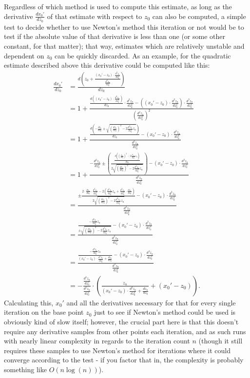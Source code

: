 \documentclass[12pt,a4paper]{article}
\begin{document}
Regardless of which method is used to compute this estimate, as long as the derivative $\frac{dx_0'}{dz_0}$ of that estimate with respect to $z_0$ can also be computed, a simple test to decide whether to use Newton's method this iteration or not would be to test if the absolute value of that derivative is less than one (or some other constant, for that matter); that way, estimates which are relatively unstable and dependent on $z_0$ can be quickly discarded. As an example, for the quadratic estimate described above this derivative could be computed like this:
\begin{align*}
	\frac{dx_0'}{dz_0} &= \frac{d\left(z_0+\frac{(x_0'-z_0)\cdot\frac{d^2z_n}{dz_0^2}}{\frac{d^2z_n}{dz_0^2}}\right)}{dz_0}\\
	&= 1+\frac{\frac{d\left((x_0'-z_0)\cdot\frac{d^2z_n}{dz_0^2}\right)}{dz_0}\cdot\frac{d^2z_n}{dz_0^2}-((x_0'-z_0)\cdot\frac{d^2z_n}{dz_0^2})\cdot\frac{d^3z_n}{dz_0^3}}{(\frac{d^2z_n}{dz_0^2})^2}\\
	&= 1+\frac{\frac{d\left(-\frac{dz_n}{dz_0}\pm\sqrt{(\frac{dz_n}{dz_0})^2-2\frac{d^2z_n}{dz_0^2}z_n}\right)}{dz_0}-(x_0'-z_0)\cdot\frac{d^3z_n}{dz_0^3}}{\frac{d^2z_n}{dz_0^2}}\\
	&= 1+\frac{-\frac{d^2z_n}{dz_0^2}\pm\left(\frac{\frac{d((\frac{dz_n}{dz_0})^2-2\frac{d^2z_n}{dz_0^2}z_n)}{dz_0}}{2\sqrt{(\frac{dz_n}{dz_0})^2-2\frac{d^2z_n}{dz_0^2}z_n}}\right)-(x_0'-z_0)\cdot\frac{d^3z_n}{dz_0^3}}{\frac{d^2z_n}{dz_0^2}}\\
	&= \frac{\pm\frac{2\cdot\frac{dz_n}{dz_0}\cdot\frac{d^2z_n}{dz_0^2}-2(\frac{d^3z_n}{dz_0^3}z_n+\frac{d^2z_n}{dz_0^2}\cdot\frac{dz_n}{dz_0})}{2\sqrt{(\frac{dz_n}{dz_0})^2-2\frac{d^2z_n}{dz_0^2}z_n}}-(x_0'-z_0)\cdot\frac{d^3z_n}{dz_0^3}}{\frac{d^2z_n}{dz_0^2}}\\
	&= \frac{\frac{-\frac{d^3z_n}{dz_0^3}z_n}{\pm\sqrt{(\frac{dz_n}{dz_0})^2-2\frac{d^2z_n}{dz_0^2}z_n}}-(x_0'-z_0)\cdot\frac{d^3z_n}{dz_0^3}}{\frac{d^2z_n}{dz_0^2}}\\
	&= \frac{\frac{-\frac{d^3z_n}{dz_0^3}z_n}{(x_0'-z_0)\cdot\frac{d^2z_n}{dz_0^2}+\frac{dz_n}{dz_0}}-(x_0'-z_0)\cdot\frac{d^3z_n}{dz_0^3}}{\frac{d^2z_n}{dz_0^2}}\\
	&= -\frac{\frac{d^3z_n}{dz_0^3}}{\frac{d^2z_n}{dz_0^2}}\cdot\left(\frac{z_n}{(x_0'-z_0)\cdot\frac{d^2z_n}{dz_0^2}+\frac{dz_n}{dz_0}}+(x_0'-z_0)\right).
\end{align*}
Calculating this, $x_0'$ and all the derivatives necessary for that for every single iteration on the base point $z_0$ just to see if Newton's method could be used is obviously kind of slow itself; however, the crucial part here is that this doesn't require any derivative samples from other points each iteration, and as such runs with nearly linear complexity in regards to the iteration count $n$ (though it still requires these samples to use Newton's method for iterations where it could converge according to the test - if you factor that in, the complexity is probably something like $O(n\log(n))$).
\end{document}
